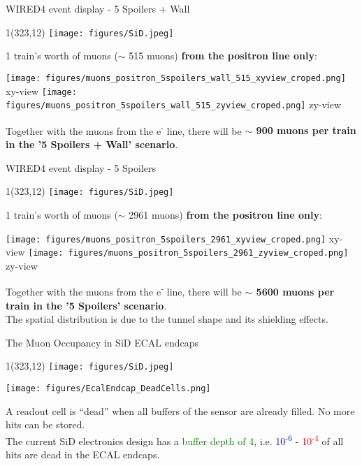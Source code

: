 \documentclass[xcolor={dvipsnames}]{beamer}
\newcommand{\sidlogo}{
  \setlength{\TPHorizModule}{1pt}
  \setlength{\TPVertModule}{1pt}
  \begin{textblock}{1}(323,12)
   \texttt{[image: figures/SiD.jpeg]}
  \end{textblock}
  }
\begin{document}
\begin{frame}{WIRED4 event display - 5 Spoilers + Wall}
\sidlogo
1 train's worth of muons ($\sim$ 515 muons) \textbf{from the positron line only}:
\begin{center}
\texttt{[image: figures/muons\_positron\_5spoilers\_wall\_515\_xyview\_croped.png]}
{\tiny xy-view}
\texttt{[image: figures/muons\_positron\_5spoilers\_wall\_515\_zyview\_croped.png]}
{\tiny zy-view}
\end{center}
Together with the muons from the e\textsuperscript{-} line, there will be \textbf{$\sim$ 900 muons per train in the '5 Spoilers + Wall' scenario}.
\end{frame}
\begin{frame}{WIRED4 event display - 5 Spoilers}
\sidlogo
1 train's worth of muons ($\sim$ 2961 muons) \textbf{from the positron line only}:
\begin{center}
\texttt{[image: figures/muons\_positron\_5spoilers\_2961\_xyview\_croped.png]}
{\tiny xy-view}
\texttt{[image: figures/muons\_positron\_5spoilers\_2961\_zyview\_croped.png]}
{\tiny zy-view}
\end{center}
Together with the muons from the e\textsuperscript{-} line, there will be \textbf{$\sim$ 5600 muons per train in the '5 Spoilers' scenario}.\\
The spatial distribution is due to the tunnel shape and its shielding effects.
\end{frame}


 
\begin{frame}{The Muon Occupancy in SiD ECAL endcaps}
\sidlogo
\begin{center}
  \texttt{[image: figures/EcalEndcap\_DeadCells.png]}
\end{center}
{\small A readout cell is ``dead'' when all buffers of the sensor are already filled. No more hits can be stored.}\\
The current SiD electronics design has a \textcolor{Green}{buffer depth of 4}, i.e. \textcolor{Blue}{10\textsuperscript{-6}} - \textcolor{Red}{10\textsuperscript{-4}} of all hits are dead in the ECAL endcaps.
\end{frame}
\end{document}

